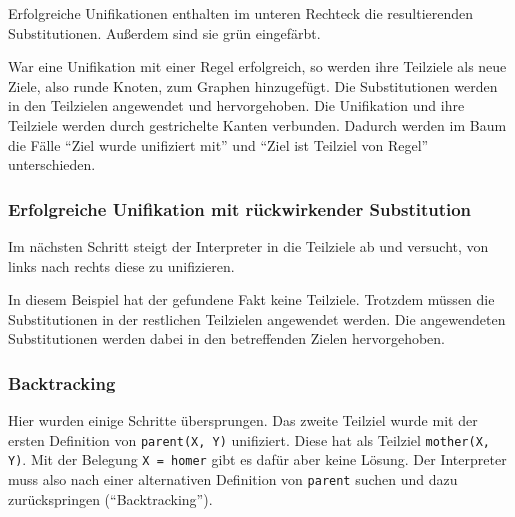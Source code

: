 \documentclass[parskip=full,11pt,twoside]{scrartcl}
\begin{document}
\begin{minipage}{\linewidth}
\end{minipage}

Erfolgreiche Unifikationen enthalten im unteren Rechteck die resultierenden Substitutionen.
Außerdem sind sie grün eingefärbt.

War eine Unifikation mit einer Regel erfolgreich, so werden ihre Teilziele als neue Ziele, also runde Knoten, zum Graphen hinzugefügt.
Die Substitutionen werden in den Teilzielen angewendet und hervorgehoben.
Die Unifikation und ihre Teilziele werden durch gestrichelte Kanten verbunden.
Dadurch werden im Baum die Fälle \enquote{Ziel wurde unifiziert mit} und \enquote{Ziel ist Teilziel von Regel} unterschieden.

\subsubsection{Erfolgreiche Unifikation mit rückwirkender Substitution}

Im nächsten Schritt steigt der Interpreter in die Teilziele ab und versucht, von links nach rechts diese zu unifizieren.

\begin{minipage}{\linewidth}
\end{minipage}

In diesem Beispiel hat der gefundene Fakt keine Teilziele.
Trotzdem müssen die Substitutionen in der restlichen Teilzielen angewendet werden.
Die angewendeten Substitutionen werden dabei in den betreffenden Zielen hervorgehoben.

\subsubsection{Backtracking}

Hier wurden einige Schritte übersprungen.
Das zweite Teilziel wurde mit der ersten Definition von \texttt{parent(X, Y)} unifiziert.
Diese hat als Teilziel \texttt{mother(X, Y)}.
Mit der Belegung \texttt{X = homer} gibt es dafür aber keine Lösung.
Der Interpreter muss also nach einer alternativen Definition von \texttt{parent} suchen und dazu zurückspringen (\enquote{Backtracking}).
\end{document}
